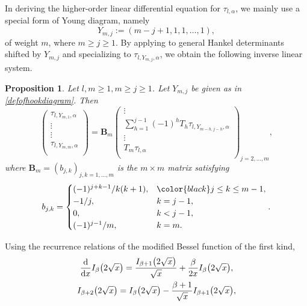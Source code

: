 \documentclass[pdftex]{sigma}
\numberwithin{equation}{section}
\newtheorem{Proposition}[Theorem]{Proposition}
\theoremstyle{definition}
\begin{document}
In deriving the higher-order linear differential equation for $\tau_{l,\alpha}$, we mainly use a special form of Young diagram, namely
\begin{equation}\label{defofhookdiagram}
Y_{m,j} := (m-j+1,1,1,\ldots,1),
\end{equation}
of weight $m$, where $m \geq j\geq 1$.
By applying \cite[Theorem~3.1]{KW24b} to general Hankel determinants shifted by $Y_{m,j}$ and specializing to $\tau_{l,Y_{m,j},\alpha}$, we obtain the following inverse linear system.

\begin{Proposition}
\label{gerenel linear systems}
Let $l,m\geq 1, m\geq j\geq 1$. Let $Y_{m,j}$ be given as in \eqref{defofhookdiagram}. Then
\begin{equation*}
\label{linear system 1}
\begin{pmatrix}
\tau_{l,Y_{m,1},\alpha} \\
\vdots \\
\vdots \\
\tau_{l,Y_{m,m},\alpha} \\
\end{pmatrix}
= \mathbf B_{m}
\begin{pmatrix}
\vdots \\
\sum_{h=1}^{j-1} (-1)^h T_{h} \tau_{l,Y_{m-h,j-h},\alpha} \\
\vdots \\
T_{m}\tau_{l,\alpha} \\
\end{pmatrix}_{j=2,\ldots,m},
\end{equation*}
where
$\mathbf B_{m}=(b_{j,k})_{j,k=1,\ldots,m}$ is the $m\times m$ matrix satisfying
\begin{equation}\label{definition of B}
b_{j,k} =\begin{cases}
(-1)^{j+k-1}/k(k+1), & {\color{black} j\leq k \leq m-1}, \\
-1/j, & k=j-1, \\
0 ,& k<j-1, \\
(-1)^{j-1}/m ,& k=m.
\end{cases}.
\end{equation}
\end{Proposition}
Using the recurrence relations of the modified Bessel function of the first kind,
\begin{gather}
\frac{\rm d}{{\rm d}x} I_{\beta}\bigl(2\sqrt{x}\bigr) =
\frac{I_{\beta+1}\bigl(2\sqrt{x}\bigr) }{\sqrt{x}} + \frac{\beta}{2x}I_{\beta}\bigl(2\sqrt{x}\bigr) , \nonumber\\
I_{\beta+2}\bigl(2\sqrt{x}\bigr) =I_{\beta}\bigl(2\sqrt{x}\bigr) -\frac{\beta +1}{\sqrt{x}}I_{\beta+1}\bigl(2\sqrt{x}\bigr) \label{recursiveformula2},
\end{gather}
\end{document}
